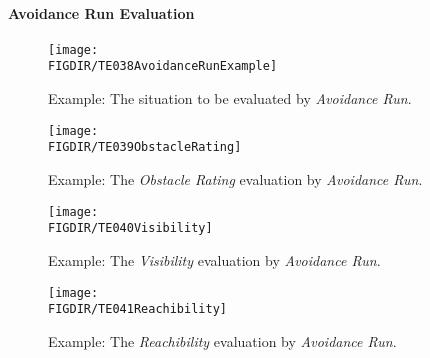 \paragraph{Avoidance Run Evaluation}

\begin{figure}[H]
\centering
    \texttt{[image: \\FIGDIR/TE038AvoidanceRunExample]}        
    \caption{Example: The situation to be evaluated by \emph{Avoidance Run}.}
    \label{fig:exampleSituationAvoidanceRun}
\end{figure}

\begin{figure}[H]
\centering
    \texttt{[image: \\FIGDIR/TE039ObstacleRating]}        
    \caption{Example: The \emph{Obstacle Rating} evaluation by \emph{Avoidance Run}.}
    \label{fig:exampleObstacleRatingEvaluation}
\end{figure}

\begin{figure}[H]
\centering
    \texttt{[image: \\FIGDIR/TE040Visibility]}        
    \caption{Example: The \emph{Visibility} evaluation by \emph{Avoidance Run}.}
    \label{fig:exampleVisibilityEvaluation}
\end{figure}
\begin{figure}[H]

\centering
    \texttt{[image: \\FIGDIR/TE041Reachibility]}        
    \caption{Example: The \emph{Reachibility} evaluation by \emph{Avoidance Run}.}
    \label{fig:exampleReachibilityEvaluation}
\end{figure}
